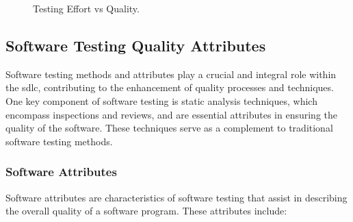 \begin{figure}[h]
\centering
{}
\caption{Testing Effort vs Quality\cite{arumugam2019software}.}\label{fig:software_testing_quality}
\end{figure}

\subsection{Software Testing Quality Attributes}

Software testing methods and attributes play a crucial and integral role within the \acrlong{sdlc},
contributing to the enhancement of quality processes and techniques. One key component of software
testing is static analysis techniques, which encompass inspections and reviews, and are essential
attributes in ensuring the quality of the software. These techniques serve as a complement to
traditional software testing methods.


\subsubsection{Software Attributes}
Software attributes are characteristics of software testing that assist in describing the
overall quality of a software program. These attributes include:


